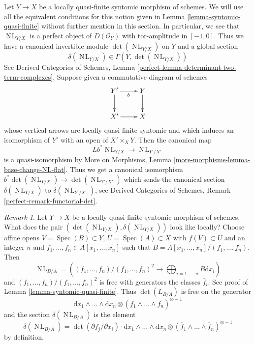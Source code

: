 \documentclass[10pt,a4paper]{amsart}
\theoremstyle{plain}
\theoremstyle{definition}
\theoremstyle{remark}
\newtheorem{remark}[subsection]{Remark}
\numberwithin{equation}{subsection}
\def\Spec{\mathop{\mathrm{Spec}}}
\def\NL{\mathop{N\!L}\nolimits}
\begin{document}
\medskip\noindent
Let $Y \to X$ be a locally quasi-finite syntomic morphism of schemes.
We will use all the equivalent conditions for this notion given in
Lemma \ref{lemma-syntomic-quasi-finite} without further mention in
this section. In particular, we see that $\NL_{Y/X}$ is a perfect
object of $D(\mathcal{O}_Y)$ with tor-amplitude in $[-1, 0]$. Thus
we have a canonical invertible module
$\det(\NL_{Y/X})$ on $Y$ and a global section
$$
\delta(\NL_{Y/X}) \in \Gamma(Y, \det(\NL_{Y/X}))
$$
See Derived Categories of Schemes, Lemma
\ref{perfect-lemma-determinant-two-term-complexes}.
Suppose given a commutative diagram of schemes
$$
\xymatrix{
Y' \ar[r]_b \ar[d] & Y \ar[d] \\
X' \ar[r] & X
}
$$
whose vertical arrows are locally quasi-finite syntomic and which
induces an isomorphism of $Y'$ with an open of $X' \times_X Y$.
Then the canonical map
$$
Lb^*\NL_{Y/X} \longrightarrow \NL_{Y'/X'}
$$
is a quasi-isomorphism by
More on Morphisms, Lemma \ref{more-morphisms-lemma-base-change-NL-flat}.
Thus we get a canonical isomorphism
$b^*\det(\NL_{Y/X}) \to \det(\NL_{Y'/X'})$ which sends the
canonical section $\delta(\NL_{Y/X})$ to $\delta(\NL_{Y'/ X'})$, see
Derived Categories of Schemes, Remark \ref{perfect-remark-functorial-det}.

\begin{remark}
\label{remark-local-description-delta}
Let $Y \to X$ be a locally quasi-finite syntomic morphism of schemes.
What does the pair $(\det(\NL_{Y/X}), \delta(\NL_{Y/X}))$ look
like locally? Choose affine opens $V = \Spec(B) \subset Y$,
$U = \Spec(A) \subset X$ with $f(V) \subset U$ and an integer $n$ and
$f_1, \ldots, f_n \in A[x_1, \ldots, x_n]$ such that
$B = A[x_1, \ldots, x_n]/(f_1, \ldots, f_n)$. Then
$$
\NL_{B/A} = \left(
(f_1, \ldots, f_n)/(f_1, \ldots, f_n)^2
\longrightarrow
\bigoplus\nolimits_{i = 1, \ldots, n} B \text{d} x_i\right)
$$
and $(f_1, \ldots, f_n)/(f_1, \ldots, f_n)^2$ is free with generators
the classes $\overline{f}_i$. See proof of
Lemma \ref{lemma-syntomic-quasi-finite}.
Thus $\det(L_{B/A})$ is free on the generator
$$
\text{d}x_1 \wedge \ldots \wedge \text{d}x_n
\otimes
(\overline{f}_1 \wedge \ldots \wedge \overline{f}_n)^{\otimes -1}
$$
and the section $\delta(\NL_{B/A})$ is the element
$$
\delta(\NL_{B/A}) =
\det(\partial f_j/ \partial x_i) \cdot
\text{d}x_1 \wedge \ldots \wedge \text{d}x_n
\otimes
(\overline{f}_1 \wedge \ldots \wedge \overline{f}_n)^{\otimes -1}
$$
by definition.
\end{remark}
\end{document}
